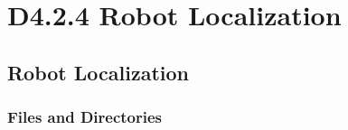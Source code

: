 \documentclass{CSSRforAfrica}
\begin{document}

\section{D4.2.4 Robot Localization}

\subsection{Robot Localization}

\subsubsection{Files and Directories}
\end{document}
